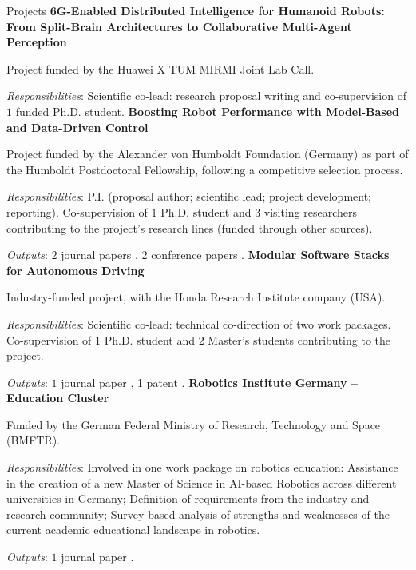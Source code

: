 \begin{rubric}{Projects}
%
\entry*[09/2026 -- present]%
	\textbf{6G-Enabled Distributed Intelligence for Humanoid Robots: From Split-Brain Architectures to Collaborative Multi-Agent Perception}
    \par Project funded by the Huawei X TUM MIRMI Joint Lab Call.
    \par \textit{Responsibilities}: Scientific co-lead: research proposal writing and co-supervision of $1$ funded Ph.D. student.
%
\entry*[02/2026 -- present]%
	\textbf{Boosting Robot Performance with Model-Based and Data-Driven Control}
    \par Project funded by the Alexander von Humboldt Foundation (Germany) as part of the Humboldt Postdoctoral Fellowship, following a competitive selection process.
    \par \textit{Responsibilities}: P.I. (proposal author; scientific lead; project development; reporting). Co-supervision of $1$ Ph.D. student and $3$ visiting researchers contributing to the project's research lines (funded through other sources).
    \par \textit{Outputs}: $2$ journal papers \cite{Mungiello2026,piccinini2026physicspriors}, $2$ conference papers \cite{Piccinini2026_roboracer,Jank2026_steering}.
%
\entry*[05/2025 -- present]%
	\textbf{Modular Software Stacks for Autonomous Driving}
    \par Industry-funded project, with the Honda Research Institute company (USA).
    \par \textit{Responsibilities}: Scientific co-lead: technical co-direction of two work packages. Co-supervision of $1$ Ph.D. student and $2$ Master's students contributing to the project.
    \par \textit{Outputs}: $1$ journal paper \cite{Jahncke2025_diffMPC}, 1 patent \cite{Honda2026_patent}.
%
\entry*[03/2025 -- 03/2026]%
	\textbf{Robotics Institute Germany -- Education Cluster}
    \par Funded by the German Federal Ministry of Research, Technology and Space (BMFTR). 
    \par \textit{Responsibilities}: Involved in one work package on robotics education: Assistance in the creation of a new Master of Science in AI-based Robotics across different universities in Germany; Definition of requirements from the industry and research community; Survey-based analysis of strengths and weaknesses of the current academic educational landscape in robotics.
    \par \textit{Outputs}: $1$ journal paper \cite{Schreiter2026}.

\end{rubric}
